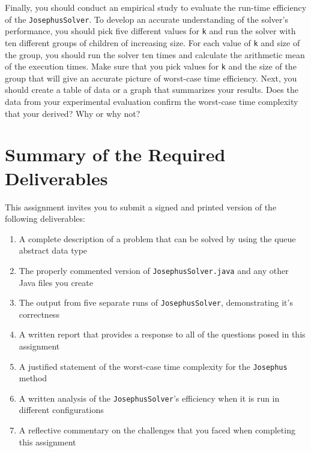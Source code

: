   Finally, you should conduct an empirical study to evaluate the run-time efficiency of the {\tt JosephusSolver}.  To
  develop an accurate understanding of the solver's performance, you should pick five different values for {\tt k} and
  run the solver with ten different groups of children of increasing size. For each value of {\tt k} and size of the
  group, you should run the solver ten times and calculate the arithmetic mean of the execution times. Make sure that
  you pick values for {\tt k} and the size of the group that will give an accurate picture of worst-case time
  efficiency. Next, you should create a table of data or a graph that summarizes your results. Does the data from your
  experimental evaluation confirm the worst-case time complexity that your derived? Why or why not?

\section*{Summary of the Required Deliverables}

  This assignment invites you to submit a signed and printed version of the following deliverables:

  \begin{enumerate}

  \item A complete description of a problem that can be solved by using the queue abstract data type

  \item The properly commented version of {\tt JosephusSolver.java} and any other Java files you create

  \item The output from five separate runs of {\tt JosephusSolver}, demonstrating it's correctness

  \item A written report that provides a response to all of the questions posed in this assignment

  \item A justified statement of the worst-case time complexity for the {\tt Josephus} method

  \item A written analysis of the {\tt JosephusSolver}'s efficiency when it is run in different configurations

  \item A reflective commentary on the challenges that you faced when completing this assignment

  \end{enumerate}

